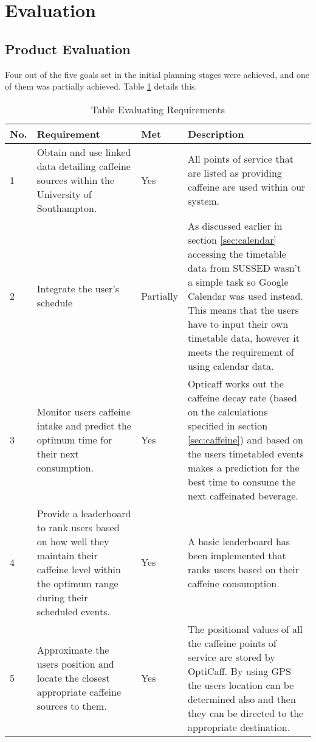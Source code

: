 \section{Evaluation}

\subsection{Product Evaluation}
Four out of the five goals set in the initial planning stages were achieved, and one of them was partially achieved. Table \ref{tab:Requirements} details this. 

\begin{table}[ht]
\caption{Table Evaluating Requirements}
\label{tab:Requirements}
\begin{tabular}{|p{20pt}|p{140pt}|p{40pt}|p{214pt}|}
\hline
	\textbf{No.} 
	& \textbf{Requirement} 													
	& \textbf{Met} 	
	& \textbf{Description} 
\\\hline
	1		
	& Obtain and use linked data detailing caffeine sources within the University of Southampton.					
	& Yes		
	& All points of service that are listed as providing caffeine are used within our system. 
\\\hline
	2 		
	& Integrate the user's schedule									
	& Partially	
	& As discussed earlier in section \ref{sec:calendar} accessing the timetable data from SUSSED wasn't a simple 
	task so Google Calendar was used instead. This means that the users have to input their own timetable data, 
	however it meets the requirement of using calendar data. 
\\\hline
	3 		
	& Monitor users caffeine intake and predict the optimum time for their next consumption.		
	& Yes		
	& Opticaff works out the caffeine decay rate (based on the calculations specified in section \ref{sec:caffeine}) 
	and based on the users timetabled events makes a prediction for the best time to consume the next caffeinated 
	beverage. 	
\\\hline
	4 		
	& Provide a leaderboard to rank users based on how well they maintain their caffeine level within the optimum 
	range during their scheduled events.	
	& Yes		
	& A basic leaderboard has been implemented that ranks users based on their caffeine consumption. 
\\\hline
	5 		
	& Approximate the users position and locate the closest appropriate caffeine sources to them.				
	& Yes		
	& The positional values of all the caffeine points of service are stored by OptiCaff. By using GPS the users 
	location can be determined also and then they can be directed to the appropriate destination. 
\\\hline
\end{tabular}
\end{table}

